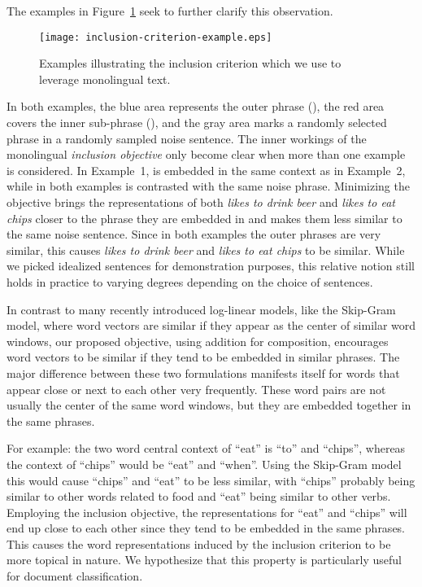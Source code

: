 \documentclass{article} \usepackage{iclr2015,times}
\begin{document}
The examples in Figure~\ref{fig:inclusion-examples} seek to further clarify
this observation.
\begin{figure}[t]
    \begin{center}
        \texttt{[image: inclusion-criterion-example.eps]}
    \end{center}
    \caption{Examples illustrating the inclusion criterion which we use to leverage
    monolingual text.}
    \label{fig:inclusion-examples}
\end{figure}
In both examples, the blue area represents the outer phrase (),
the red area covers the inner sub-phrase (), and the gray area
marks a randomly selected phrase in a randomly sampled noise sentence.
The inner workings of the monolingual \emph{inclusion objective} only become
clear when more than one example is considered.
In Example~1,  is embedded in the same context as in
Example~2, while in both examples  is contrasted with the same noise
phrase.
Minimizing the objective brings the representations of both
\emph{likes to drink beer} and \emph{likes to eat chips} closer to the phrase
they are embedded in and makes them less similar to the same noise sentence.
Since in both examples the outer phrases are very similar, this causes
\emph{likes to drink beer} and \emph{likes to eat chips} to be
similar.
While we picked idealized sentences for demonstration purposes, this relative
notion still holds in practice to varying degrees depending on the choice
of sentences.

In contrast to many recently introduced log-linear models, like the Skip-Gram
model, where word vectors are similar if they appear as the center of similar
word windows, our proposed objective, using addition for composition, encourages
word vectors to be similar if they tend to be embedded in similar phrases.
The major difference between these two formulations manifests itself for words
that appear close or next to each other very frequently.
These word pairs are not usually the center of the same word windows,
but they are embedded together in the same phrases.

For example: the two word central context of ``eat'' is ``to'' and
``chips'', whereas the context of ``chips'' would be ``eat'' and ``when''.
Using the Skip-Gram model this would cause ``chips'' and ``eat'' to be
less similar, with ``chips'' probably being similar to other words related to
food and ``eat'' being similar to other verbs.
Employing the inclusion objective, the representations for ``eat'' and
``chips'' will end up close to each other since they tend to be embedded in the
same phrases.
This causes the word representations induced by the inclusion criterion to be
more topical in nature.
We hypothesize that this property is particularly useful for document
classification.
\end{document}
